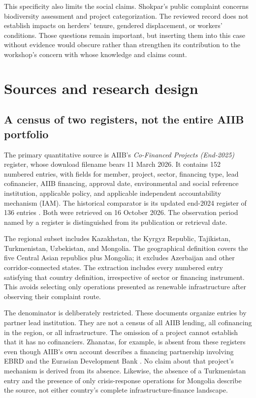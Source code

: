 \documentclass[11pt,a4paper]{article}
\begin{document}
This specificity also limits the social claims. Shokpar's public complaint concerns biodiversity assessment and project categorization. The reviewed record does not establish impacts on herders' tenure, gendered displacement, or workers' conditions. Those questions remain important, but inserting them into this case without evidence would obscure rather than strengthen its contribution to the workshop's concern with whose knowledge and claims count.

\section{Sources and research design}
\subsection{A census of two registers, not the entire AIIB portfolio}
The primary quantitative source is AIIB's \emph{Co-Financed Projects (End-2025)} register, whose download filename bears 11 March 2026. It contains 152 numbered entries, with fields for member, project, sector, financing type, lead cofinancier, AIIB financing, approval date, environmental and social reference institution, applicable policy, and applicable independent accountability mechanism (IAM). The historical comparator is its updated end-2024 register of 136 entries \citep{register2025,register2024}. Both were retrieved on 16 October 2026. The observation period named by a register is distinguished from its publication or retrieval date.

The regional subset includes Kazakhstan, the Kyrgyz Republic, Tajikistan, Turkmenistan, Uzbekistan, and Mongolia. The geographical definition covers the five Central Asian republics plus Mongolia; it excludes Azerbaijan and other corridor-connected states. The extraction includes every numbered entry satisfying that country definition, irrespective of sector or financing instrument. This avoids selecting only operations presented as renewable infrastructure after observing their complaint route.

The denominator is deliberately restricted. These documents organize entries by partner lead institution. They are not a census of all AIIB lending, all cofinancing in the region, or all infrastructure. The omission of a project cannot establish that it has no cofinanciers. Zhanatas, for example, is absent from these registers even though AIIB's own account describes a financing partnership involving EBRD and the Eurasian Development Bank \citep{aiib2019impact}. No claim about that project's mechanism is derived from its absence. Likewise, the absence of a Turkmenistan entry and the presence of only crisis-response operations for Mongolia describe the source, not either country's complete infrastructure-finance landscape.
\end{document}
